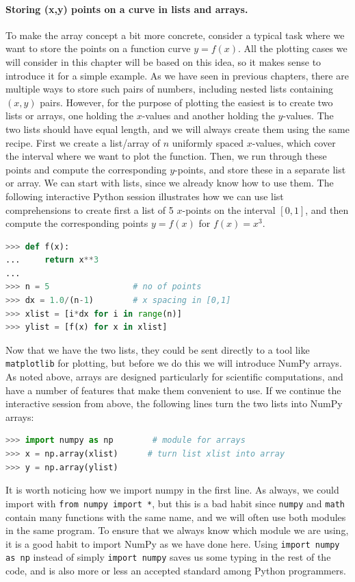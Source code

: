 \documentclass[graybox,envcountchap,sectrefs,final]{svmonodo}
\begin{document}
\paragraph{Storing (x,y) points on a curve in lists and arrays.}
To make the array concept a bit more concrete, consider a typical task where we want to store the points on a
function curve $y=f(x)$. All the plotting cases we will consider in this chapter will be based on this idea,
so it makes sense to introduce it for a simple example. As we have seen in previous chapters, there are multiple
ways to store such pairs of numbers, including nested lists containing $(x,y)$ pairs. However, for the purpose of
plotting the easiest is to create two lists or arrays, one holding the $x$-values and another holding the $y$-values.
The two lists should have equal length, and we will always create them using the same recipe. First we create a
list/array of $n$ uniformly spaced $x$-values, which cover the interval where we want to plot the function. Then, we
run through these points and compute the corresponding $y$-points, and store these in a separate list or array.
We can start with lists, since we already know how to use them. The following interactive Python
session illustrates how we can use list comprehensions to create first a list of 5 $x$-points on the
interval $[0,1]$, and then compute the corresponding points $y=f(x)$ for $f(x) = x^3$.
\begin{lstlisting}[language=Python,style=blue1]
>>> def f(x):
...     return x**3
...
>>> n = 5                 # no of points
>>> dx = 1.0/(n-1)        # x spacing in [0,1]
>>> xlist = [i*dx for i in range(n)]
>>> ylist = [f(x) for x in xlist]
\end{lstlisting}
Now that we have the two lists, they could be sent directly to a tool like \texttt{matplotlib} for plotting, but before
we do this we will introduce NumPy arrays. As noted above, arrays are designed particularly for scientific
computations, and have a number of features that make them convenient to use. If we continue the interactive session
from above, the following lines turn the two lists into NumPy arrays:
\begin{lstlisting}[language=Python,style=blue1]
>>> import numpy as np        # module for arrays
>>> x = np.array(xlist)      # turn list xlist into array
>>> y = np.array(ylist)
\end{lstlisting}
It is worth noticing how we import numpy in the first line. As always, we could import with \texttt{from numpy import *},
but this is a bad habit since \texttt{numpy} and \texttt{math} contain many functions with the same name, and we will often use
both modules in the same program. To ensure that we always know which module we are using, it is a good habit to
import NumPy as we have done here. Using \texttt{import numpy as np} instead of simply \texttt{import numpy} saves us some
typing in the rest of the code, and is also more or less an accepted standard among Python programmers.
\end{document}
